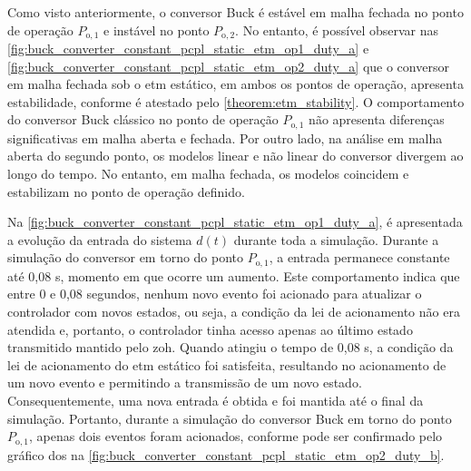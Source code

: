 Como visto anteriormente, o conversor Buck é estável em malha fechada no ponto de operação  $P_{\mathrm{o}, 1}$ e instável no ponto  $P_{\mathrm{o}, 2}$. No entanto, é possível observar nas \autoref{fig:buck_converter_constant_pcpl_static_etm_op1_duty_a} e \autoref{fig:buck_converter_constant_pcpl_static_etm_op2_duty_a} que o conversor em malha fechada sob o \acrshort{etm} estático, em ambos os pontos de operação,  apresenta estabilidade, conforme é atestado pelo \autoref{theorem:etm_stability}. O comportamento do conversor Buck clássico no ponto de operação $P_{\mathrm{o}, 1}$ não apresenta diferenças significativas em malha aberta e fechada. Por outro lado, na análise em malha aberta do segundo ponto, os modelos linear e não linear do conversor divergem ao longo do tempo. No entanto, em malha fechada, os modelos coincidem e estabilizam no ponto de operação definido.

Na \autoref{fig:buck_converter_constant_pcpl_static_etm_op1_duty_a}, é apresentada a evolução da entrada do sistema $d(t)$ durante toda a simulação. Durante a simulação do conversor em torno do ponto $P_{\mathrm{o}, 1}$, a entrada permanece constante até 0,08 s, momento em que ocorre um aumento. Este comportamento indica que entre 0 e 0,08 segundos, nenhum novo evento foi acionado para atualizar o controlador com novos estados, ou seja, a condição da lei de acionamento não era atendida e, portanto, o controlador tinha acesso apenas ao último estado transmitido mantido pelo \acrshort{zoh}. Quando atingiu o tempo de 0,08 s, a condição da lei de acionamento do \acrshort{etm} estático foi satisfeita, resultando no acionamento de um novo evento e permitindo a transmissão de um novo estado. Consequentemente, uma nova entrada é obtida e foi mantida até o final da simulação. Portanto, durante a simulação do conversor Buck em torno do ponto $P_{\mathrm{o}, 1}$, apenas dois eventos foram acionados, conforme pode ser confirmado pelo gráfico dos  na \autoref{fig:buck_converter_constant_pcpl_static_etm_op2_duty_b}.


